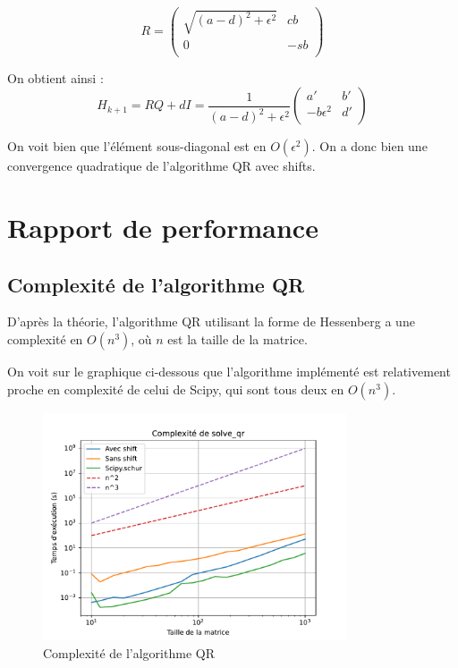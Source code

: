 \documentclass[11pt]{article}
\begin{document}
$$R = \begin{pmatrix}
    \sqrt{(a - d)^2 + \epsilon^2} & c b \\
    0 & -s b \\
\end{pmatrix}$$

On obtient ainsi :
$$H_{k+1} = RQ + dI = \frac{1}{(a-d)^2+\epsilon^2} \begin{pmatrix}
    a' & b' \\
    - b \epsilon^2 & d' \\
\end{pmatrix}$$

On voit bien que l'élément sous-diagonal est en $O(\epsilon^2)$. On a donc bien une convergence quadratique de l'algorithme QR avec shifts.

\section{Rapport de performance}

\subsection{Complexité de l'algorithme QR}

D'après la théorie, l'algorithme QR utilisant la forme de Hessenberg a une complexité en $O(n^3)$, où $n$ est la taille de la matrice.

On voit sur le graphique ci-dessous que l'algorithme implémenté est relativement proche en complexité de celui de Scipy, qui sont tous deux en $O(n^3)$.

\begin{figure}[h]
\centering
\includegraphics[width=0.8\textwidth]{images/compare_solve_qr_complexity.pdf}
\caption{Complexité de l'algorithme QR}
\end{figure}
\end{document}
